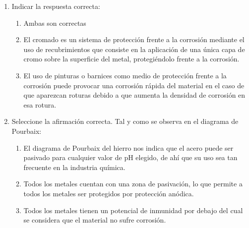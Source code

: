 \begin{enumerate}
    \item Indicar la respuesta correcta:
          \begin{enumerate}[label=\alph*.]
              \item Ambas son correctas
              \item El cromado es un sistema de protección frente a la corrosión mediante el uso de recubrimientos que consiste en la aplicación de una única capa de cromo sobre la superficie del metal, protegiéndolo frente a la corrosión.
              \item \textcolor{red!85!black}{El uso de pinturas o barnices como medio de protección frente a la corrosión puede provocar una corrosión rápida del material en el caso de que aparezcan roturas debido a que aumenta la densidad de corrosión en esa rotura.}
          \end{enumerate}

    \item Seleccione la afirmación correcta. Tal y como se observa en el diagrama de Pourbaix:
          \begin{enumerate}[label=\alph*.]
              \item El diagrama de Pourbaix del hierro nos indica que el acero puede ser pasivado para cualquier valor de pH elegido, de ahí que su uso sea tan frecuente en la industria química.
              \item Todos los metales cuentan con una zona de pasivación, lo que permite a todos los metales ser protegidos por protección anódica.
              \item \textcolor{red!85!black}{Todos los metales tienen un potencial de inmunidad por debajo del cual se considera que el material no sufre corrosión.}
          \end{enumerate}


\end{enumerate}
